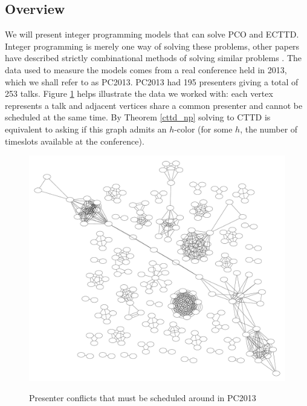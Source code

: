 \documentclass{svjour3}                     %
\begin{document}
\subsection{Overview}
We will present integer programming models that can solve PCO and ECTTD. Integer programming is merely one way of solving these problems, other papers have described strictly combinational methods of solving similar problems \cite{cheng}. The data used to measure the models comes from a real conference held in 2013, which we shall refer to as PC2013. PC2013 had 195 presenters giving a total of 253 talks. Figure \ref{fig_pc2013_graph} helps illustrate the data we worked with: each vertex represents a talk and adjacent vertices share a common presenter and cannot be scheduled at the same time. By Theorem \ref{cttd_np} solving to CTTD is equivalent to asking if this graph admits an $h$-color (for some $h$, the number of timeslots available at the conference).
\begin{figure}[h!]
	\caption{Presenter conflicts that must be scheduled around in PC2013}
	\centering
	\includegraphics[scale=0.2]{penguiconconflict}
	\label{fig_pc2013_graph}
\end{figure}
\end{document}
